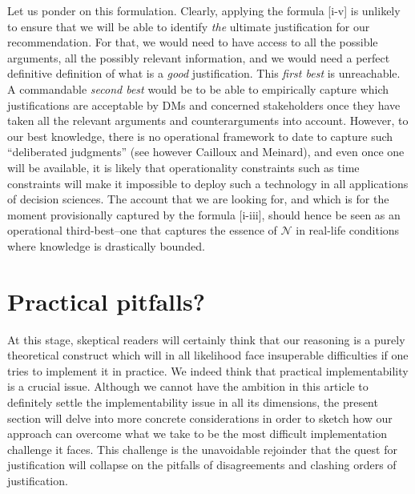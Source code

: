\documentclass[preprint, french, english, 11pt, authoryear]{elsarticle}%
\newcommand{\adv}{\mathscr{N}}
\begin{document}
Let us ponder on this formulation. Clearly, applying the formula [i-v] is unlikely to ensure that we will be able to identify \emph{the} ultimate justification for our recommendation. For that, we would need to have access to all the possible arguments, all the possibly relevant information, and we would need a perfect definitive definition of what is a \emph{good} justification. This \emph{first best} is unreachable. A commandable \emph{second best} would be to be able to empirically capture which justifications are acceptable by \acp{DM} and concerned stakeholders once they have taken all the relevant arguments and counterarguments into account. However, to our best knowledge, there is no operational framework to date to capture such ``deliberated judgments'' (see however Cailloux and Meinard), and even once one will be available, it is likely that operationality constraints such as time constraints will make it impossible to deploy such a technology in all applications of decision sciences. The account that we are looking for, and which is for the moment provisionally captured by the formula [i-iii], should hence be seen as an operational third-best--one that captures the essence of $\adv$ in real-life conditions where knowledge is drastically bounded.

\section{Practical pitfalls?}
At this stage, skeptical readers will certainly think that our reasoning is a purely theoretical construct which will in all likelihood face insuperable difficulties if one tries to implement it in practice. We indeed think that practical implementability is a crucial issue. Although we cannot have the ambition in this article to definitely settle the implementability issue in all its dimensions, the present section will delve into more concrete considerations in order to sketch how our approach can overcome what we take to be the most difficult implementation challenge it faces. This challenge is the unavoidable rejoinder that the quest for justification will collapse on the pitfalls of disagreements and clashing orders of justification.
\end{document}
